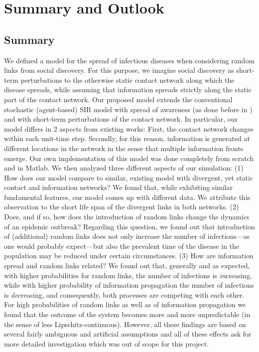 \documentclass[11pt]{article}
\begin{document}
\section{Summary and Outlook}


\subsection*{Summary}

We defined a model for the spread of infectious diseases when considering random links from social discovery. For this purpose, we imagine social discovery as short-term perturbations to the otherwise static contact network along which the disease spreads, while assuming that information spreads strictly along the static part of the contact network. Our proposed model extends the conventional stochastic (agent-based) SIR model with spread of awareness (as done before in \citep{Funk}) and with short-term perturbations of the contact network. In particular, our model differs in 2 aspects from existing works: First, the contact network changes within each unit-time step. Secondly, for this reason, information is generated at different locations in the network in the sense that multiple information fronts emerge. Our own implementation of this model was done completely from scratch and in Matlab. We then analyzed three different aspects of our simulation: (1) How does our model compare to similar, existing model with divergent, yet static contact and information networks? We found that, while exhibiting similar fundamental features, our model comes up with different data. We attribute this observation to the short life span of the divergent links in both networks. (2) Does, and if so, how does the introduction of random links change the dynamics of an epidemic outbreak? Regarding this question, we found out that introduction of (additional) random links does not only increase the number of infections---as one would probably expect---but also the prevalent time of the disease in the population may be reduced under certain circumstances. (3) How are information spread and random links related? We found out that, generally and as expected, with higher probabilities for random links, the number of infections is {\it in}creasing, while with higher probability of information propagation the number of infections is {\it de}creasing, and consequently, both processes are competing with each other. For high probabilities of random links as well as of information propagation we found that the outcome of the system becomes more and more unpredictable (in the sense of less Lipschitz-continuous). However, all these findings are based on several fairly ambiguous and artificial assumptions and all of these effects ask for more detailed investigation which was out of scope for this project.
\end{document}
